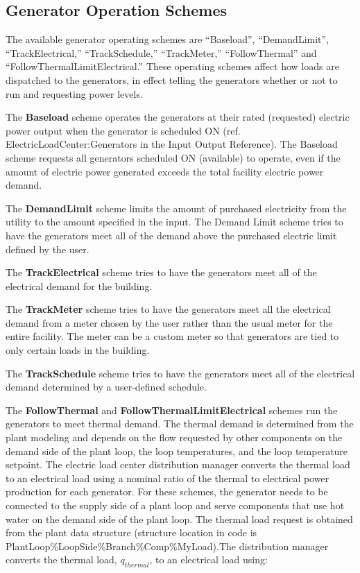 \subsection{Generator Operation Schemes}

The available generator operating schemes are “Baseload”, “DemandLimit”, “TrackElectrical,” “TrackSchedule,” “TrackMeter,” “FollowThermal” and “FollowThermalLimitElectrical.”  These operating schemes affect how loads are dispatched to the generators, in effect telling the generators whether or not to run and requesting power levels.

The \textbf{Baseload} scheme operates the generators at their rated (requested) electric power output when the generator is scheduled ON (ref. ElectricLoadCenter:Generators in the Input Output Reference). The Baseload scheme requests all generators scheduled ON (available) to operate, even if the amount of electric power generated exceeds the total facility electric power demand.

The \textbf{DemandLimit} scheme limits the amount of purchased electricity from the utility to the amount specified in the input. The Demand Limit scheme tries to have the generators meet all of the demand above the purchased electric limit defined by the user.

The \textbf{TrackElectrical} scheme tries to have the generators meet all of the electrical demand for the building.

The \textbf{TrackMeter} scheme tries to have the generators meet all the electrical demand from a meter chosen by the user rather than the usual meter for the entire facility. The meter can be a custom meter so that generators are tied to only certain loads in the building.

The \textbf{TrackSchedule} scheme tries to have the generators meet all of the electrical demand determined by a user-defined schedule.

The \textbf{FollowThermal} and \textbf{FollowThermalLimitElectrical} schemes run the generators to meet thermal demand. The thermal demand is determined from the plant modeling and depends on the flow requested by other components on the demand side of the plant loop, the loop temperatures, and the loop temperature setpoint. The electric load center distribution manager converts the thermal load to an electrical load using a nominal ratio of the thermal to electrical power production for each generator. For these schemes, the generator needs to be connected to the supply side of a plant loop and serve components that use hot water on the demand side of the plant loop. The thermal load request is obtained from the plant data structure (structure location in code is PlantLoop\%LoopSide\%Branch\%Comp\%MyLoad).The distribution manager converts the thermal load, $q_{thermal}$, to an electrical load using:

